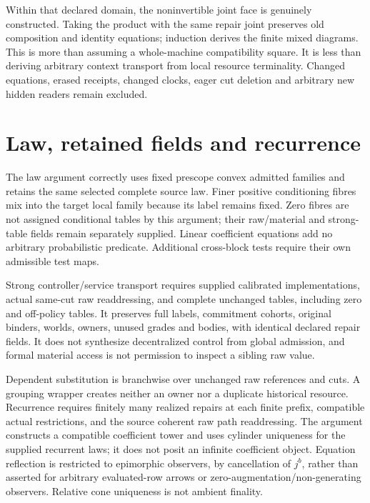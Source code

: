 \documentclass{article}
\begin{document}
Within that declared domain, the noninvertible joint face is genuinely constructed. Taking the product with the same repair joint preserves old composition and identity equations; induction derives the finite mixed diagrams. This is more than assuming a whole-machine compatibility square. It is less than deriving arbitrary context transport from local resource terminality. Changed equations, erased receipts, changed clocks, eager cut deletion and arbitrary new hidden readers remain excluded.

\section*{Law, retained fields and recurrence}
The law argument correctly uses fixed prescope convex admitted families and retains the same selected complete source law. Finer positive conditioning fibres mix into the target local family because its label remains fixed. Zero fibres are not assigned conditional tables by this argument; their raw/material and strong-table fields remain separately supplied. Linear coefficient equations add no arbitrary probabilistic predicate. Additional cross-block tests require their own admissible test maps.

Strong controller/service transport requires supplied calibrated implementations, actual same-cut raw readdressing, and complete unchanged tables, including zero and off-policy tables. It preserves full labels, commitment cohorts, original binders, worlds, owners, unused grades and bodies, with identical declared repair fields. It does not synthesize decentralized control from global admission, and formal material access is not permission to inspect a sibling raw value.

Dependent substitution is branchwise over unchanged raw references and cuts. A grouping wrapper creates neither an owner nor a duplicate historical resource. Recurrence requires finitely many realized repairs at each finite prefix, compatible actual restrictions, and the source coherent raw path readdressing. The argument constructs a compatible coefficient tower and uses cylinder uniqueness for the supplied recurrent laws; it does not posit an infinite coefficient object. Equation reflection is restricted to epimorphic observers, by cancellation of $j^b$, rather than asserted for arbitrary evaluated-row arrows or zero-augmentation/non-generating observers. Relative cone uniqueness is not ambient finality.
\end{document}
